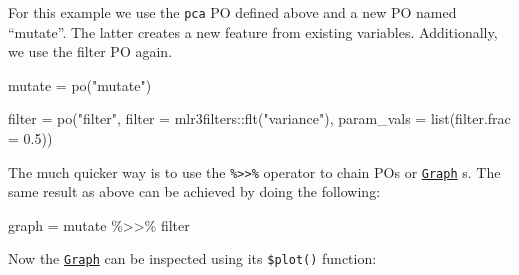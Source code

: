 \documentclass[
]{scrbook}
\newenvironment{Shaded}{\begin{snugshade}}{\end{snugshade}}
\newcommand{\AttributeTok}[1]{\textcolor[rgb]{0.77,0.63,0.00}{#1}}
\newcommand{\CommentTok}[1]{\textcolor[rgb]{0.56,0.35,0.01}{\textit{#1}}}
\newcommand{\FloatTok}[1]{\textcolor[rgb]{0.00,0.00,0.81}{#1}}
\newcommand{\FunctionTok}[1]{\textcolor[rgb]{0.00,0.00,0.00}{#1}}
\newcommand{\NormalTok}[1]{#1}
\newcommand{\OtherTok}[1]{\textcolor[rgb]{0.56,0.35,0.01}{#1}}
\newcommand{\SpecialCharTok}[1]{\textcolor[rgb]{0.00,0.00,0.00}{#1}}
\newcommand{\StringTok}[1]{\textcolor[rgb]{0.31,0.60,0.02}{#1}}
\renewenvironment{Shaded} {\begin{snugshade}\small} {\end{snugshade}}
\begin{document}
For this example we use the \texttt{pca} PO defined above and a new PO named ``mutate''.
The latter creates a new feature from existing variables.
Additionally, we use the filter PO again.

\begin{Shaded}
\begin{Highlighting}[]
\NormalTok{mutate }\OtherTok{=} \FunctionTok{po}\NormalTok{(}\StringTok{"mutate"}\NormalTok{)}

\NormalTok{filter }\OtherTok{=} \FunctionTok{po}\NormalTok{(}\StringTok{"filter"}\NormalTok{,}
  \AttributeTok{filter =}\NormalTok{ mlr3filters}\SpecialCharTok{::}\FunctionTok{flt}\NormalTok{(}\StringTok{"variance"}\NormalTok{),}
  \AttributeTok{param\_vals =} \FunctionTok{list}\NormalTok{(}\AttributeTok{filter.frac =} \FloatTok{0.5}\NormalTok{))}
\end{Highlighting}
\end{Shaded}

\begin{Shaded}
\end{Shaded}

The much quicker way is to use the \texttt{\%\textgreater{}\textgreater{}\%} operator to chain POs or \href{https://mlr3pipelines.mlr-org.com/reference/Graph.html}{\texttt{Graph}} s.
The same result as above can be achieved by doing the following:

\begin{Shaded}
\begin{Highlighting}[]
\NormalTok{graph }\OtherTok{=}\NormalTok{ mutate }\SpecialCharTok{\%\textgreater{}\textgreater{}\%}\NormalTok{ filter}
\end{Highlighting}
\end{Shaded}

Now the \href{https://mlr3pipelines.mlr-org.com/reference/Graph.html}{\texttt{Graph}} can be inspected using its \texttt{\$plot()} function:

\begin{Shaded}
\end{Shaded}
\end{document}
